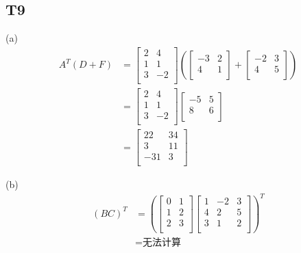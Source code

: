 \documentclass{article}
\begin{document}
\subsection{T9}
(a)
\begin{align*}
    A^T(D+F) &=
    \begin{bmatrix}
        2 & 4\\
        1 & 1\\
        3 & -2\\
    \end{bmatrix}
    \left(
    \begin{bmatrix}
        -3 & 2\\
        4 & 1\\
    \end{bmatrix}
    +
    \begin{bmatrix}
        -2 & 3\\
        4 & 5\\
    \end{bmatrix}
    \right)\\
    &=
    \begin{bmatrix}
        2 & 4\\
        1 & 1\\
        3 & -2\\
    \end{bmatrix}
    \begin{bmatrix}
        -5 & 5\\
        8 & 6\\
    \end{bmatrix}\\
    &=
    \begin{bmatrix}
        22 & 34\\
        3 & 11\\
        -31 & 3\\
    \end{bmatrix}
\end{align*}

(b)
\begin{align*}
    (BC)^T &=
    \left(
    \begin{bmatrix}
        0 & 1\\
        1 & 2\\
        2 & 3\\
    \end{bmatrix}
    \begin{bmatrix}
        1 & -2 & 3\\
        4 & 2 & 5\\
        3 & 1 & 2\\
    \end{bmatrix}
    \right)^T\\
    &= \text{无法计算}
\end{align*}
\end{document}
